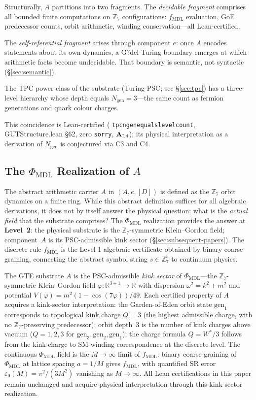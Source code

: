 \documentclass[12pt,letterpaper]{article}
\newcommand{\fmdl}{f_{\mathrm{MDL}}}
\newcommand{\Zseven}{\mathbb{Z}_7}
\newcommand{\Dclass}{[D]}
\newcommand{\ngen}{N_{\mathrm{gen}}}
\newcommand{\catAL}{\ensuremath{\textbf{A}_{\rm L4}}}
\newcommand{\lean}[1]{%
  \penalty-100
  \begingroup\def\_{\textunderscore\allowbreak}\texttt{#1}\endgroup}
\begin{document}
Structurally, $A$ partitions into two fragments.  The \emph{decidable fragment}
comprises all bounded finite computations on $\Zseven$ configurations: $\fmdl$
evaluation, GoE predecessor counts, orbit arithmetic, winding conservation---all
Lean-certified.

The \emph{self-referential fragment} arises through component $e$: once $A$ encodes
statements about its own dynamics, a G?del-Turing boundary emerges at which arithmetic
facts become undecidable.  That boundary is semantic, not syntactic
(\S\ref{sec:semantic}).

The TPC power class of the substrate (Turing-PSC; see \S\ref{sec:tpc}) has a
three-level hierarchy whose depth equals $\ngen = 3$---the same count as fermion
generations and quark colour charges.

This coincidence is Lean-certified
(\lean{tpc\_ngen\_equals\_level\_count}, GUTStructure.lean \S62, zero
\texttt{sorry}, \catAL); its physical interpretation as a derivation of $\ngen$ is
conjectured via C3 and C4.

\subsection{The \texorpdfstring{$\Phi_{\mathrm{MDL}}$}{Phi\_MDL} Realization of \texorpdfstring{$A$}{A}}
\label{sec:phimdl-realization}

The abstract arithmetic carrier $A$ in $(A, e, \Dclass)$ is defined as the $\Zseven$
orbit dynamics on a finite ring.  While this abstract definition suffices for all
algebraic derivations, it does not by itself answer the physical question: what is
the \emph{actual field} that the substrate comprises?  The $\Phi_{\mathrm{MDL}}$
realization provides the answer at \textbf{Level~2}: the physical substrate is the
$\Zseven$-symmetric Klein--Gordon field; component~$A$ is its PSC-admissible kink
sector (\S\ref{sec:subsequent-papers}).  The discrete rule $\fmdl$ is the Level-1
algebraic certificate obtained by binary coarse-graining, connecting the abstract
symbol string $s \in \Zseven^5$ to continuum physics.

The GTE substrate $A$ is the PSC-admissible \emph{kink sector} of
$\Phi_{\mathrm{MDL}}$---the $\Zseven$-symmetric Klein--Gordon field
$\varphi : \mathbb{R}^{3+1} \to \mathbb{R}$ with dispersion
$\omega^2 = k^2 + m^2$ and potential
$V(\varphi) = m^2(1 - \cos(7\varphi))/49$.
Each certified property of $A$ acquires a kink-sector interpretation:
the Garden-of-Eden orbit state $\mathrm{gen}_1$ corresponds to topological
kink charge $Q = 3$ (the highest admissible charge, with no $\Zseven$-preserving
predecessor); orbit depth~3 is the number of kink charges above vacuum
($Q = 1,2,3$ for $\mathrm{gen}_3, \mathrm{gen}_2, \mathrm{gen}_1$); the charge
formula $Q = W^*/3$ follows from the kink-charge to SM-winding correspondence
at the discrete level.
The continuous $\Phi_{\mathrm{MDL}}$ field is the $M \to \infty$ limit of
$\fmdl$: binary coarse-graining of $\Phi_{\mathrm{MDL}}$ at lattice spacing
$a = 1/M$ gives $\fmdl$, with quantified SR error
$\varepsilon_0(M) = \pi^2/(3M^2)$ vanishing as $M \to \infty$.
All Lean certifications in this paper remain unchanged and acquire physical
interpretation through this kink-sector realization.
\end{document}
